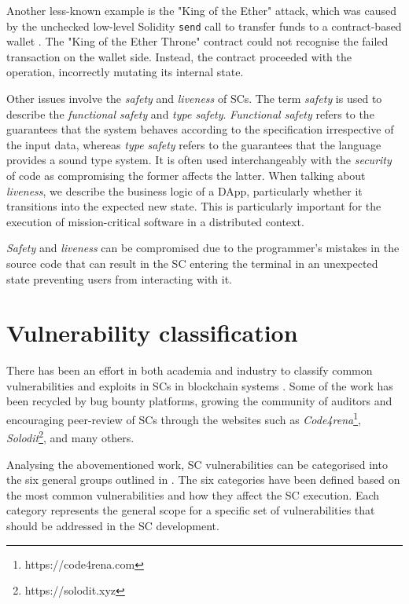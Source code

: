 \documentclass[oneside]{ecsproject}     %
\begin{document}
Another less-known example is the "King of the Ether" attack, which was caused by the unchecked low-level Solidity \texttt{send} call to transfer funds to a contract-based wallet \cite{king_of_the_ether}.
The "King of the Ether Throne" contract could not recognise the failed transaction on the wallet side. Instead, the contract proceeded with the operation, incorrectly mutating its internal state.

Other issues involve the \textit{safety} and \textit{liveness} of SCs. 
The term \textit{safety} is used to describe the \textit{functional safety} and \textit{type safety}. \textit{Functional safety} refers to the guarantees that the system behaves according to the specification irrespective of the input data\cite{func_safety},
whereas \textit{type safety} refers to the guarantees that the language provides a sound type system\cite{types_pierce}.
It is often used interchangeably with the \textit{security} of code
as compromising the former affects the latter. When talking about \textit{liveness}, we describe the business logic of a DApp, particularly whether it transitions into the expected new state\cite{liveness_rob}.
This is particularly important for the execution of mission-critical software in a distributed context.

\textit{Safety} and \textit{liveness} can be compromised due to the programmer's mistakes in the source code that can result in the SC entering the terminal in an unexpected state
preventing users from interacting with it\cite{ondo_report}.


\section{Vulnerability classification}

There has been an effort in both academia and industry to classify common vulnerabilities 
and exploits in SCs in blockchain systems \cite{owasp}\cite{stefano}\cite{atzei_survey}. 
Some of the work has been recycled by bug bounty platforms, growing the community of auditors
and encouraging peer-review of SCs through the websites such as \textit{Code4rena}\footnote{https://code4rena.com}, \textit{Solodit}\footnote{https://solodit.xyz},
and many others.

Analysing the abovementioned work, SC vulnerabilities can be categorised into the six general groups outlined in .
The six categories have been defined based on the most common vulnerabilities and how they affect the SC execution. 
Each category represents the general scope for a specific set of vulnerabilities that should be addressed in the SC development.
\end{document}
